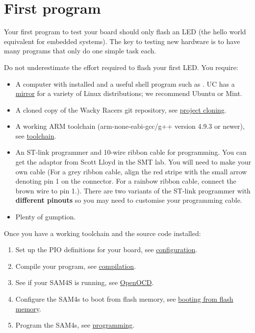 \chapter{First program}
\label{first-program}

Your first program to test your board should only flash an LED (the
hello world equivalent for embedded systems). The key to testing new
hardware is to have many programs that only do one simple task each.

Do not underestimate the effort required to flash your first LED. You
require:
%
\begin{itemize}
\item
  A computer with  installed and a useful shell program
  such as . UC has a
  \href{http://ucmirror.canterbury.ac.nz/}{mirror} for a variety of
  Linux distributions; we recommend Ubuntu or Mint.

\item A cloned copy of the Wacky Racers git repository, see
  \hyperref[project-cloning]{project cloning}.

\item
  A working ARM toolchain (arm-none-eabi-gcc/g++ version 4.9.3 or
  newer), see \hyperref[toolchain]{toolchain}.

\item
  An ST-link programmer and 10-wire ribbon cable for programming. You
  can get the adaptor from Scott Lloyd in the SMT lab. You will need
  to make your own cable (For a grey ribbon cable, align the red
  stripe with the small arrow denoting pin 1 on the connector. For a
  rainbow ribbon cable, connect the brown wire to pin 1.). There are
  two variants of the ST-link programmer with \textbf{different
  pinouts} so you may need to customise your programming cable.
\item
  Plenty of gumption.
\end{itemize}


Once you have a working toolchain and the source code installed:
%
\begin{enumerate}
\item Set up the PIO definitions for your board, see
  \hyperref[configuration]{configuration}.

\item Compile your program, see \hyperref[compilation]{compilation}.

\item See if your SAM4S is running, see \hyperref[openocd]{OpenOCD}.

\item Configure the SAM4s to boot from flash memory, see
  \hyperref[booting-from-flash-memory]{booting from flash memory}.

\item Program the SAM4s, see \hyperref[programming]{programming}.
\end{enumerate}


